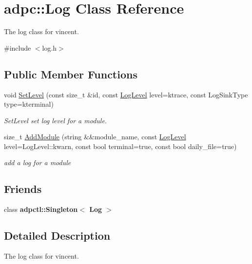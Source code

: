 \hypertarget{classadpc_1_1Log}{}\section{adpc\+:\+:Log Class Reference}
\label{classadpc_1_1Log}


The log class for vincent.  




{\ttfamily \#include $<$log.\+h$>$}

\subsection*{Public Member Functions}
\begin{DoxyCompactItemize}
\item 
void \hyperlink{classadpc_1_1Log_aef0274bae7eb7286d090bb1953c2bc29}{Set\+Level} (const size\+\_\+t \&id, const \hyperlink{log__config_8h_a172986fa5f658c5fe0b42bd954e9e133}{Log\+Level} level=ktrace, const Log\+Sink\+Type type=kterminal)
\begin{DoxyCompactList}\small\item\em Set\+Level set log level for a module. \end{DoxyCompactList}\item 
size\+\_\+t \hyperlink{classadpc_1_1Log_a6b5cdb7e0f4a7cd5f29d031af4800ea7}{Add\+Module} (string \&\&module\+\_\+name, const \hyperlink{log__config_8h_a172986fa5f658c5fe0b42bd954e9e133}{Log\+Level} level=Log\+Level\+::kwarn, const bool terminal=true, const bool daily\+\_\+file=true)
\begin{DoxyCompactList}\small\item\em add a log for a module \end{DoxyCompactList}\end{DoxyCompactItemize}
\subsection*{Friends}
\begin{DoxyCompactItemize}
\item 
\mbox{\label{classadpc_1_1Log_a0e7b4c16064e3789d935b1b3523d78c7}} 
class {\bfseries adpctl\+::\+Singleton$<$ Log $>$}
\end{DoxyCompactItemize}


\subsection{Detailed Description}
The log class for vincent. 

